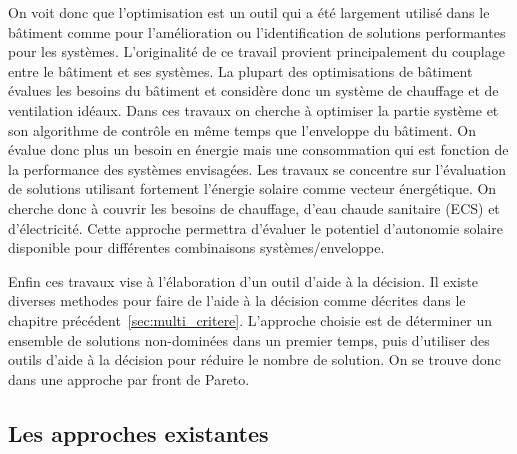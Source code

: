 On voit donc que l’optimisation est un outil qui a été largement utilisé dans
le bâtiment comme pour l’amélioration ou l’identification de solutions performantes
pour les systèmes.
L’originalité de ce travail provient principalement du couplage entre le bâtiment
et ses systèmes. La plupart des optimisations de bâtiment évalues les besoins
du bâtiment et considère donc un système de chauffage et de ventilation idéaux.
Dans ces travaux on cherche à optimiser la partie système et son algorithme de
contrôle en même temps que l’enveloppe du bâtiment. On évalue donc plus un besoin
en énergie mais une consommation qui est fonction de la performance des systèmes
envisagées. Les travaux se concentre sur l’évaluation de solutions utilisant fortement
l’énergie solaire comme vecteur énergétique. On cherche donc à couvrir les besoins
de chauffage, d’eau chaude sanitaire (ECS) et d’électricité.
Cette approche permettra d’évaluer le potentiel d’autonomie solaire disponible
pour différentes combinaisons systèmes/enveloppe.

Enfin ces travaux vise à l’élaboration d’un outil d’aide à la décision. Il existe
diverses methodes pour faire de l’aide à la décision comme décrites dans le chapitre
précédent~\autoref{sec:multi_critere}. L’approche choisie est de déterminer un
ensemble de solutions non-dominées dans un premier temps, puis d’utiliser des
outils d’aide à la décision pour réduire le nombre de solution. On se trouve donc
dans une approche par front de Pareto.



\subsection{Les approches existantes} %
\label{sub:les_approches_existantes}



